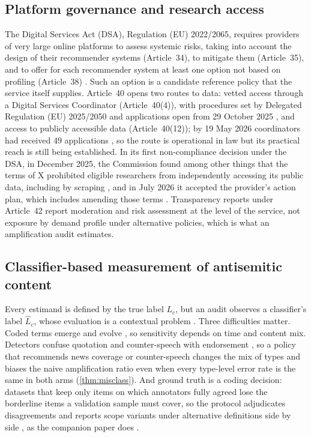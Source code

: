 \subsection{Platform governance and research access}\label{sec:bg-governance}

The Digital Services Act (DSA), Regulation (EU) 2022/2065, requires providers of very large online platforms to assess systemic risks, taking into account the design of their recommender systems (Article~34), to mitigate them (Article~35), and to offer for each recommender system at least one option not based on profiling (Article~38) \citep{eu2022dsa}. Such an option is a candidate reference policy that the service itself supplies. Article~40 opens two routes to data: vetted access through a Digital Services Coordinator (Article~40(4)), with procedures set by Delegated Regulation (EU) 2025/2050 and applications open from 29 October 2025 \citep{eu2025delegated,ec2025access}, and access to publicly accessible data (Article~40(12)); by 19 May 2026 coordinators had received 49 applications \citep{ec2026roundtable}, so the route is operational in law but its practical reach is still being established. In its first non-compliance decision under the DSA, in December 2025, the Commission found among other things that the terms of X prohibited eligible researchers from independently accessing its public data, including by scraping \citep{ec2025fine}, and in July 2026 it accepted the provider's action plan, which includes amending those terms \citep{ec2026actionplan}. Transparency reports under Article~42 \citep{eu2024transparency} report moderation and risk assessment at the level of the service, not exposure by demand profile under alternative policies, which is what an amplification audit estimates.

\subsection{Classifier-based measurement of antisemitic content}\label{sec:bg-classifier}

Every estimand is defined by the true label $L_c$, but an audit observes a classifier's label $\widehat L_c$, whose evaluation is a contextual problem \citep{kornsteinlab2026detection,kornsteinlab2026measurement}. Three difficulties matter. Coded terms emerge and evolve \citep{zannettou2020}, so sensitivity depends on time and content mix. Detectors confuse quotation and counter-speech with endorsement \citep{rottger2021}, so a policy that recommends news coverage or counter-speech changes the mix of types and biases the naive amplification ratio even when every type-level error rate is the same in both arms (\cref{thm:misclass}). And ground truth is a coding decision: datasets that keep only items on which annotators fully agreed \citep{jikeli2023} lose the borderline items a validation sample must cover, so the protocol adjudicates disagreements and reports scope variants under alternative definitions side by side \citep{ihra2016,jda2021}, as the companion paper does \citep{kornsteinlab2026darkfigure}.
